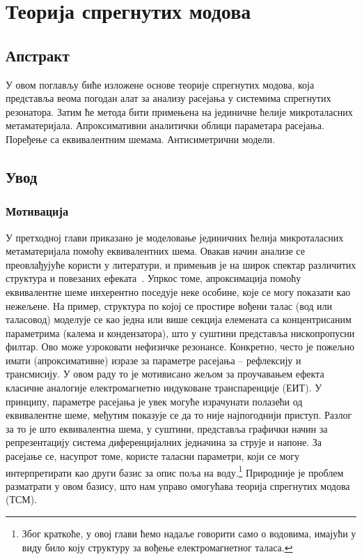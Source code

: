\documentclass[main.tex]{subfiles}
\begin{document}
\chapter{Теорија спрегнутих модова}
\label{ch:tsm}

\section{Апстракт}
У овом поглављу биће изложене основе теорије спрегнутих модова, која представља веома погодан алат за анализу расејања у системима спрегнутих резонатора. Затим ће метода бити примењена на јединичне ћелије микроталасних метаматеријала. Апроксимативни аналитички облици параметара расејања. Поређење са еквивалентним шемама. Антисиметрични модели.

\section{Увод}
\subsection{Мотивација}%
У претходној глави приказано је моделовање јединичних ћелија микроталасних метаматеријала помоћу еквивалентних шема. Овакав начин анализе се преовлађујуће користи у литератури, и примењив је на широк спектар различитих структура и повезаних ефеката~\cite{baena,aznar_improved,naqui:13,radoman}.
Упркос томе, апроксимација помоћу еквивалентне шеме инхерентно поседује неке особине, које се могу показати као нежељене.
На пример, структура по којој се простире вођени талас (вод или таласовод) моделује се као једна или више секција елемената са концентрисаним параметрима (калема и кондензатора), што у суштини представља нископропусни филтар. Ово може узроковати нефизичке резонансе.
Конкретно, често је пожељно имати (апроксимативне) изразе за параметре расејања -- рефлексију и трансмисију. У овом раду то је мотивисано жељом за проучавањем ефекта класичне аналогије електромагнетно индуковане транспаренције (ЕИТ). У принципу, параметре расејања је увек могуће израчунати полазећи од еквивалентне шеме, међутим показује се да то није најпогоднији приступ. Разлог за то је што еквивалентна шема, у суштини, представља графички начин за репрезентацију система диференцијалних једначина за струје и напоне. За расејање се, насупрот томе, користе таласни параметри, који се могу интерпретирати као други базис за опис поља на воду.\footnote{Због краткоће, у овој глави ћемо надаље говорити само о водовима, имајући у виду било коју структуру за вођење електромагнетног таласа.} Природније је проблем разматрати у овом базису, што нам управо омогућава теорија спрегнутих модова (ТСМ).
\end{document}

